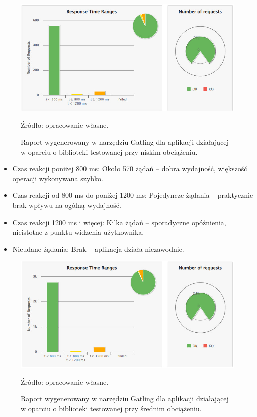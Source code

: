 \documentclass[runningheads,12pt]{llncs}
\begin{document}
\begin{figure}
    \centering
    \includegraphics[width=0.8\linewidth]{images/library-gatling-low-graph.jpg}
    \caption{Raport wygenerowany w narzędziu Gatling dla aplikacji działającej w oparciu o biblioteki testowanej przy niskim obciążeniu.}
    \vspace{0.5em}
    {\small Źródło: opracowanie własne.}
    \label{fig:low}
\end{figure}

\begin{itemize}
    \item Czas reakcji poniżej 800 ms: Około 570 żądań – dobra wydajność, większość operacji wykonywana szybko.
    \item Czas reakcji od 800 ms do poniżej 1200 ms: Pojedyncze żądania – praktycznie brak wpływu na ogólną wydajność.
    \item Czas reakcji 1200 ms i więcej: Kilka żądań – sporadyczne opóźnienia, nieistotne z punktu widzenia użytkownika.
    \item Nieudane żądania: Brak – aplikacja działa niezawodnie.
\end{itemize}

\newpage

\begin{figure}
    \centering
    \includegraphics[width=0.8\linewidth]{images/library-gatling-middle-graph.jpg}
    \caption{Raport wygenerowany w narzędziu Gatling dla aplikacji działającej w oparciu o biblioteki testowanej przy średnim obciążeniu.}
    \vspace{0.5em}
    {\small Źródło: opracowanie własne.}
    \label{fig:middle}
\end{figure}
\end{document}
